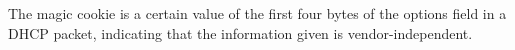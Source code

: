 The magic cookie is a certain value of the first four bytes of the options field in a DHCP packet, indicating that the information given is vendor-independent.
